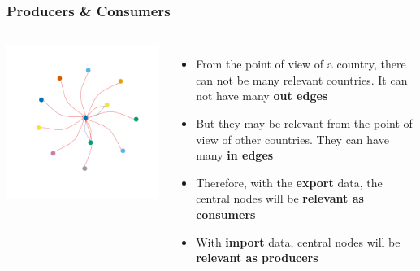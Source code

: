 \documentclass[professionalfont,fleqn]{beamer}
\begin{document}
\begin{frame}
\frametitle{Producers \& Consumers}	
	\begin{columns}
			\includegraphics[width=\linewidth]{toy_graph1}
		
		\begin{itemize}
			\item From the point of view of a country, there can not be many relevant countries. It can not have many \textbf{out edges}
			\item But they may be relevant from the point of view of other countries. They can have many \textbf{in edges} 
			\item Therefore, with the \textbf{export} data, the central nodes will be \textbf{relevant as consumers}
			\item With \textbf{import} data, central nodes will be \textbf{relevant as producers}
			
		\end{itemize}	
	\end{columns}	
\end{frame}
		
\end{document}
